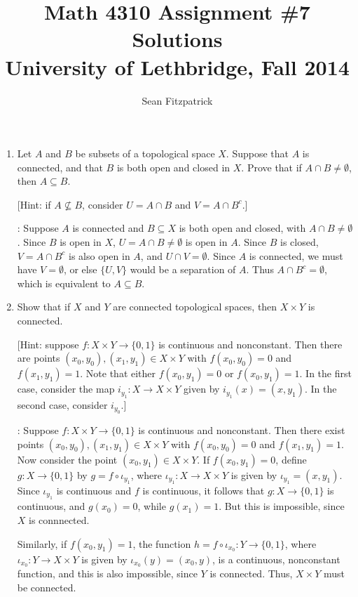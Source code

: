 \documentclass[letterpaper,12pt]{article}
\title{Math 4310 Assignment \#7 Solutions\\University of Lethbridge, Fall 2014}
\author{Sean Fitzpatrick}
\begin{document}
 \maketitle

\begin{enumerate}
\item Let $A$ and $B$ be subsets of a topological space $X$. Suppose that $A$ is connected, and that $B$ is both open and closed in $X$. Prove that if $A\cap B\neq\emptyset$, then $A\subseteq B$.

[Hint: if $A\nsubseteq B$, consider $U=A\cap B$ and $V=A\cap B^c$.]

\bigskip

: Suppose $A$ is connected and $B\subseteq X$ is both open and closed, with $A\cap B\neq \emptyset$. Since $B$ is open in $X$, $U=A\cap B\neq \emptyset$ is open in $A$. Since $B$ is closed, $V=A\cap B^c$ is also open in $A$, and $U\cap V = \emptyset$. Since $A$ is connected, we must have $V=\emptyset$, or else $\{U,V\}$ would be a separation of $A$. Thus $A\cap B^c=\emptyset$, which is equivalent to $A\subseteq B$.

\bigskip

\item Show that if $X$ and $Y$ are connected topological spaces, then $X\times Y$ is connected.

[Hint: suppose $f:X\times Y\to\{0,1\}$ is continuous and nonconstant. Then there are points $(x_0,y_0),(x_1,y_1)\in X\times Y$ with $f(x_0,y_0)=0$ and $f(x_1,y_1)=1$. Note that either $f(x_0,y_1)=0$ or $f(x_0,y_1)=1$. In the first case, consider the map $i_{y_1}:X\to X\times Y$ given by $i_{y_1}(x) = (x,y_1)$. In the second case, consider $i_{y_0}$.]

\bigskip

: Suppose $f:X\times Y\to \{0,1\}$ is continuous and nonconstant. Then there exist points $(x_0,y_0),(x_1,y_1)\in X\times Y$ with $f(x_0,y_0)=0$ and $f(x_1,y_1)=1$. Now consider the point $(x_0,y_1)\in X\times Y$. If $f(x_0,y_1)=0$, define $g:X\to \{0,1\}$ by $g = f\circ \iota_{y_1}$, where $\iota_{y_1}:X\to X\times Y$ is given by $\iota_{y_1} = (x,y_1)$. Since $\iota_{y_1}$ is continuous and $f$ is continuous, it follows that $g:X\to \{0,1\}$ is continuous, and $g(x_0)=0$, while $g(x_1)=1$. But this is impossible, since $X$ is connnected.

Similarly, if $f(x_0,y_1)=1$, the function $h=f\circ \iota_{x_0}:Y\to \{0,1\}$, where $\iota_{x_0}:Y\to X\times Y$ is given by $\iota_{x_0}(y) = (x_0,y)$, is a continuous, nonconstant function, and this is also impossible, since $Y$ is connected. Thus, $X\times Y$ must be connected.


\end{enumerate}
\end{document}
